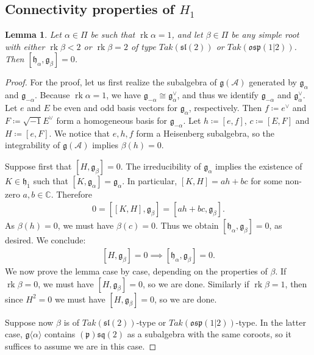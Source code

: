 \documentclass[12pt, a4paper, reqno]{amsart}
\def\p{\mathfrak{p}}
\def\g{\mathfrak{g}}
\def\h{\mathfrak{h}}
\def\l{\mathfrak{l}}
\def\s{\mathfrak{s}}
\def\o{\mathfrak{o}}
\def\ol{\overline}
\def\rk{\operatorname{rk}}
\newtheorem{lemma}{Lemma}
\theoremstyle{definition}
\theoremstyle{definition}
\theoremstyle{definition}
\numberwithin{theorem}{section}
\numberwithin{lemma}{section}
\numberwithin{remark}{section}
\numberwithin{definition}{section}
\numberwithin{corollary}{section}
\numberwithin{proposition}{section}
\numberwithin{example}{section}
\begin{document}
	\subsection{Connectivity properties of $H_1$} 
	\begin{lemma}\label{lemma-rank-1}
		Let \(\alpha \in \Pi\) be such that \(\rk\alpha= 1\), and let \(\beta \in \Pi\) be any simple root with either $\rk\beta<2$ or $\rk\beta=2$ of type $Tak(\s\l(2))$ or $Tak(\o\s\p(1|2))$. Then $[\h_{\alpha},\g_{\beta}]=0$. 
	\end{lemma}
	\begin{proof}		
		For the proof, let us first realize the subalgebra of \(\mathfrak{g}(\mathcal{A})\) generated by \(\mathfrak{g}_{\alpha}\) and \(\mathfrak{g}_{-\alpha}\). Because \(\rk\alpha = 1\), we have \(\mathfrak{g}_{-\alpha} \cong\mathfrak{g}_{\alpha}^\vee\), and thus we identify $\g_{-\alpha}$ and $\g_{\alpha}^\vee$. Let \(e\) and \(E\) be even and odd basis vectors for \(\mathfrak{g}_{\alpha}\), respectively. Then \(f \coloneq e^\vee\) and \(F \coloneq \sqrt{-1}E^\vee\) form a homogeneous basis for \(\mathfrak{g}_{-\alpha}\). Let \(h \coloneq [e,f]\), \(c \coloneq [E,F]\) and \(H \coloneq [e,F]\). We notice that \(e,h,f\) form a Heisenberg subalgebra, so the integrability of \(\mathfrak{g}(\mathcal{A})\) implies \(\beta(h) = 0\). \par 
		Suppose first that \([H,\mathfrak{g}_{\beta}]=0\). The irreducibility of \(\mathfrak{g}_{\alpha}\) implies the existence of \(K\in\mathfrak{h}_{\ol{1}}\) such that \([K,\mathfrak{g}_{\alpha}]=\mathfrak{g}_{\alpha}\). In particular, \([K,H] = ah+bc\) for some non-zero \(a,b \in \mathbb{C}\). Therefore
		\begin{align*}
			0 = [[K,H],\mathfrak{g}_{\beta}] = [ah+bc,\mathfrak{g}_{\beta}].
		\end{align*}
		As \(\beta(h) = 0\), we must have \(\beta(c) = 0\). Thus we obtain \([\h_{\alpha},\mathfrak{g}_{\beta}] = 0\), as desired. We conclude:
		\begin{align}\label{equation-root-implication}
			[H,\mathfrak{g}_{\beta}]=0 \implies [\h_{\alpha},\g_{\beta}]= 0.
		\end{align}
		We now prove the lemma case by case, depending on the properties of \(\beta\). If \(\rk\beta = 0\), we must have \([H,\mathfrak{g}_{\beta}] = 0\), so we are done.  Similarly if $\rk\beta=1$, then since $H^2=0$ we must have $[H,\g_{\beta}]=0$, so we are done.
		
		Suppose now \(\beta\) is of $Tak(\s\l(2))$-type or $Tak(\o\s\p(1|2))$-type.  In the latter case, $\g\langle\alpha\rangle$ contains $(\p)\mathfrak{sq}(2)$ as a subalgebra with the same coroots, so it suffices to assume we are in this case.
		

\end{proof}
\end{document}
